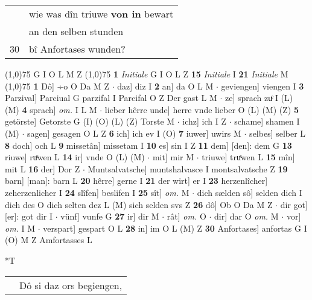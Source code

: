 \documentclass[8pt,a4paper,notitlepage]{article}
\begin{document}
\begin{table}[ht]
\begin{minipage}[t]{0.5\linewidth}
\begin{tabular}{rl}
 & wie was dîn triuwe \textbf{von in} bewart\\ 
 & an den selben stunden\\ 
30 & bî Anfortases wunden?\\ 
\end{tabular}
\scriptsize
\line(1,0){75} \newline
G I O L M Z \newline
\line(1,0){75} \newline
\textbf{1} \textit{Initiale} G I O L Z  \textbf{15} \textit{Initiale} I  \textbf{21} \textit{Initiale} M  \newline
\line(1,0){75} \newline
\textbf{1} Dô] ÷o O Da M Z  $\cdot$ daz] diz I \textbf{2} an] da O L M  $\cdot$ geviengen] viengen I \textbf{3} Parzival] Parciual G parzifal I Parcifal O Z Der gast L M  $\cdot$ ze] sprach zuͤ I (L) (M) \textbf{4} sprach] \textit{om.} I L M  $\cdot$ lieber hêrre unde] herre vnde lieber O (L) (M) (Z) \textbf{5} getörste] Getorste G (I) (O) (L) (Z) Torste M  $\cdot$ ichz] ich I Z  $\cdot$ schame] shamen I (M)  $\cdot$ sagen] gesagen O L Z \textbf{6} ich] ich ev I (O) \textbf{7} iuwer] uwirs M  $\cdot$ selbes] selber L \textbf{8} doch] och L \textbf{9} missetân] missetam I \textbf{10} es] sin I Z \textbf{11} dem] [den]: dem G \textbf{13} riuwe] ruͯwen L \textbf{14} ir] vnde O (L) (M)  $\cdot$ mit] mir M  $\cdot$ triuwe] truͯwen L \textbf{15} mîn] mit L \textbf{16} der] Dor Z  $\cdot$ Muntsalvatsche] muntshalvasce I montsalvatsche Z \textbf{19} barn] [man]: barn L \textbf{20} hêrre] gerne I \textbf{21} der wirt] er I \textbf{23} herzenlîcher] zeherzenlicher I \textbf{24} slîfen] beslifen I \textbf{25} sît] \textit{om.} M  $\cdot$ dich sælden sô] selden dich I dich des O dich selten dez L (M) sich selden svs Z \textbf{26} dô] Ob O Da M Z  $\cdot$ dir got] [er]: got dir I  $\cdot$ vünf] vunfe G \textbf{27} ir] dir M  $\cdot$ rât] \textit{om.} O  $\cdot$ dir] dar O \textit{om.} M  $\cdot$ vor] \textit{om.} I M  $\cdot$ verspart] gespart O L \textbf{28} in] im O L (M) Z \textbf{30} Anfortases] anfortas G I (O) M Z Amfortasses L \newline
\end{minipage}
\hspace{0.5cm}
\begin{minipage}[t]{0.5\linewidth}
\small
\begin{center}*T
\end{center}
\begin{tabular}{rl}
 & Dô si daz ors begiengen,\\ 

\end{tabular}
\end{minipage}
\end{table}
\end{document}
